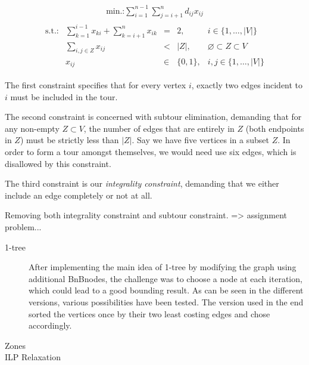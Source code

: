 \documentclass{article}
\begin{document}
\begin{align*}
  \text{min.:} \sum_{i=1}^{n-1}\sum_{j=i+1}^{n} d_{ij}x_{ij}
\end{align*}
\begin{align*}
  \begin{array}{lrcll}
    \text{s.t.:} & \displaystyle\sum_{k=1}^{i-1}x_{ki} + \displaystyle\sum_{k=i+1}^{n} x_{ik} &= &2, & i\in \{1,\dots,|V|\}\\
                 & \displaystyle\sum_{i,j\in Z} x_{ij} &< &|Z|, & \varnothing \subset Z \subset V\\
                 & x_{ij} &\in & \{0,1\}, & i,j \in \{1,\dots,|V|\}
  \end{array}
\end{align*}

The first constraint specifies that for every vertex $i$, exactly two
edges incident to $i$ must be included in the tour.

The second constraint is concerned with subtour elimination, demanding
that for any non-empty $Z\subset V$, the number of edges that are
entirely in $Z$ (both endpoints in $Z$) must be strictly less than
$|Z|$. Say we have five vertices in a subset $Z$. In order to form a
tour amongst themselves, we would need use six edges, which is
disallowed by this constraint.

The third constraint is our \emph{integrality constraint}, demanding
that we either include an edge completely or not at all.

Removing both integrality constraint and subtour constraint. => assignment problem...

\begin{description}
\item[1-tree] After implementing the main idea of 1-tree by modifying the graph using additional BnBnodes, the challenge was to choose a node at each iteration, which could lead to a good bounding result. As can be seen in the different versions, various possibilities have been tested. The version used in the end sorted the vertices once by their two least costing edges and chose accordingly.
\item[Zones]
\item[ILP Relaxation]
\end{description}

    
\end{document}
